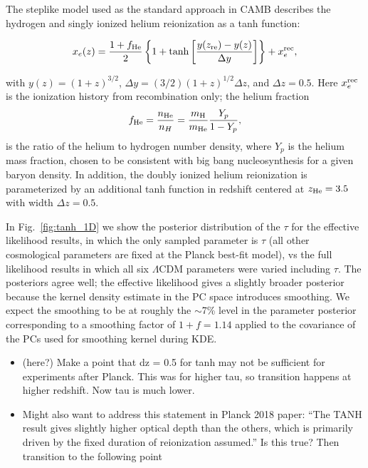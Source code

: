 \documentclass[prd,twocolumn,amsmath,amssymb,floatfix,superscriptaddress,nofootinbib]{revtex4-1}
\newcommand{\reffig}[1]{Fig.~\ref{fig:#1}}
\newcommand{\beq}{\begin{equation}}
\newcommand{\eeq}{\end{equation}}
\begin{document}
The steplike model used as the standard approach in CAMB describes the hydrogen and singly ionized helium reionization as a tanh function:

 \begin{equation}
x_e(z) = \frac{1+f_{\rm He}}{2}\left\{  1+ \tanh\left[ \frac{y(z_{\rm re})-y(z)}{\Delta y} \right] \right\} + x_e^{\rm rec},
 \label{eqn:tanh_1D}
 \end{equation}
 
 with $y(z)=(1+z)^{3/2}$, $\Delta y=(3/2)(1+z)^{1/2}\Delta z$, and $\Delta z = 0.5$. Here $x_e^{\rm rec}$ is the ionization history from recombination only; the helium fraction
 \beq
 f_{\rm He} = \frac{n_{\rm He}}{n_{H}} = \frac{m_{\rm H}}{m_{\rm He}} \frac{Y_p}{1 - Y_p}, 
 \eeq
 is the ratio of the helium to hydrogen number density, where $Y_p$ is the helium mass fraction, chosen to be consistent with big bang nucleosynthesis for a given baryon density. In addition, the doubly ionized helium reionization is parameterized by an additional tanh function in redshift centered at $z_{\rm He} = 3.5$ with width $\Delta z = 0.5$.

In \reffig{tanh_1D} we show the posterior distribution of the $\tau$ for the effective likelihood results, in which the only sampled parameter is $\tau$ (all other cosmological parameters are fixed at the Planck best-fit model), vs the full likelihood results in which all six $\Lambda$CDM parameters were varied including $\tau$. The posteriors agree well; the effective likelihood gives a slightly broader posterior because the kernel density estimate in the PC space introduces smoothing. We expect the smoothing to be at roughly the $\sim$7\% level in the parameter posterior corresponding to a smoothing factor of $1+f = 1.14$ applied to the covariance of the PCs used for smoothing kernel during KDE.

\begin{itemize}
    \item (here?) Make a point that dz = 0.5 for tanh may not be sufficient for experiments after Planck. This was for higher tau, so transition happens at higher redshift. Now tau is much lower.
    \item{Might also want to address this statement in Planck 2018 paper: ``The TANH result gives slightly higher optical  depth  than  the  others,  which  is  primarily driven  by  the  fixed  duration  of  reionization assumed.” Is this true? Then transition to the following point}
\end{itemize}
\end{document}
